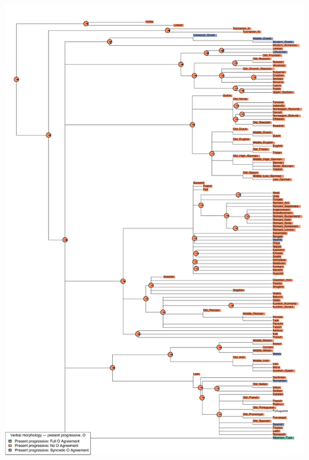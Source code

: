 \includegraphics[width=.9\linewidth]{supp-graphics/VerbalmorphologypresentprogressiveOPROGNOOAGRVerbalmorphologypresentprogressiveOPROGOAGRFULLVerbalmorphologypresentprogressiveOPROGOGenderAGR.pdf}

